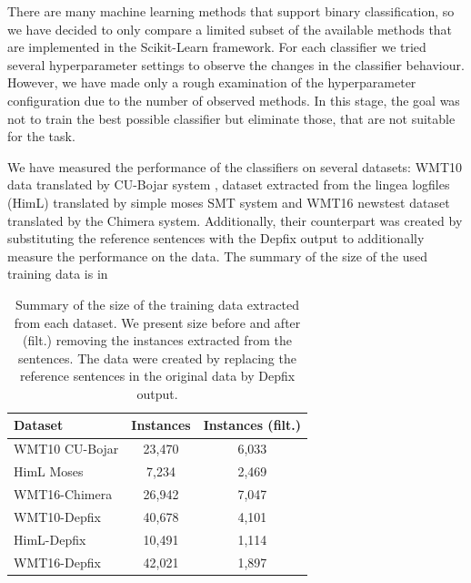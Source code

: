 There are many machine learning methods that support binary classification, so we have
decided to only compare a limited subset of the available methods that are implemented
in the Scikit-Learn framework. For each classifier we tried several hyperparameter
settings to observe the changes in the classifier behaviour. However, we have made only
a rough examination of the hyperparameter configuration due to the number of observed
methods. In this stage, the goal was not to train the best possible classifier but
eliminate those, that are not suitable for the task.

We have measured the performance of the classifiers on several datasets:
WMT10 data translated by CU-Bojar system \citep{biblio:BoJaProbesin2012},
dataset extracted from the lingea logfiles (HimL) translated by simple moses SMT system \citep{Koehn:2007:MOS:1557769.1557821} and
WMT16 newstest dataset translated by the Chimera system.
Additionally, their counterpart was
created by substituting the reference sentences with the Depfix output
to additionally measure the performance on the  data.
The summary of the size of the used training data is in~

\begin{table}[t]
\centering
\small

\begin{tabular}{lcc}
Dataset  &  \hash{} Instances  &  \hash{} Instances (filt.)  \\
\hline
WMT10 CU-Bojar  &  23,470  &  6,033  \\
HimL Moses  & 7,234  &  2,469  \\
WMT16-Chimera  &  26,942  &  7,047  \\
WMT10-Depfix  &  40,678  &  4,101  \\
HimL-Depfix  &  10,491  &  1,114  \\
WMT16-Depfix  &  42,021  &  1,897  \\
\end{tabular}
\caption{
    Summary of the size of the training data extracted from each dataset. We present
size before and after (filt.) removing the instances extracted from the  sentences.
The  data were created by replacing the reference sentences in the original
data by Depfix output.
}
\label{wf-training-sum}
\end{table}


